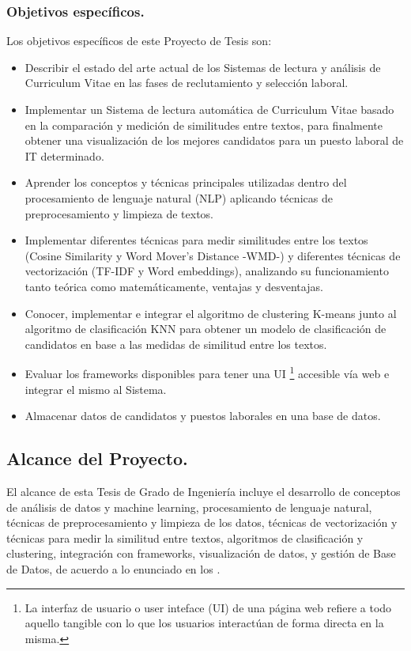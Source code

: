 \documentclass[12pt,a4paper]{article}
\begin{document}
\begin{sloppypar}
\subsubsection{Objetivos específicos.}\label{Obj_especif}
Los objetivos específicos de este Proyecto de Tesis son:
\begin{itemize}
\item Describir el estado del arte actual de los Sistemas de lectura y análisis de Curriculum Vitae en las fases de reclutamiento y selección laboral. 
\item Implementar un Sistema de lectura automática de Curriculum Vitae basado en la comparación y medición de similitudes entre textos, para finalmente obtener una visualización de los mejores candidatos para un puesto laboral de IT determinado.  
\item Aprender los conceptos y técnicas principales utilizadas dentro del procesamiento de lenguaje natural (NLP) aplicando técnicas de preprocesamiento y limpieza de textos.
\item Implementar diferentes técnicas para medir similitudes entre los textos (Cosine Similarity y Word Mover's Distance -WMD-) y diferentes técnicas de vectorización (TF-IDF y Word embeddings), analizando su funcionamiento tanto teórica como matemáticamente, ventajas y desventajas.
\item Conocer, implementar e integrar el algoritmo de clustering K-means junto al algoritmo de clasificación KNN para obtener un modelo de clasificación de candidatos en base a las medidas de similitud entre los textos.
\item Evaluar los frameworks disponibles para tener una UI \footnote{La interfaz de usuario o user inteface (UI) de una página web refiere a todo aquello tangible con lo que los usuarios interactúan de forma directa en la misma.} accesible vía web e integrar el mismo al Sistema.
\item Almacenar datos de candidatos y puestos laborales en una base de datos.
\end{itemize} 

\cleardoublepage    %

\subsection{Alcance del Proyecto.}
El alcance de esta Tesis de Grado de Ingeniería incluye el desarrollo de conceptos de análisis de datos y machine learning, procesamiento de lenguaje natural, técnicas de preprocesamiento y limpieza de los datos, técnicas de vectorización y técnicas para medir la similitud entre textos, algoritmos de clasificación y clustering, integración con frameworks, visualización de datos, y gestión de Base de Datos, de acuerdo a lo enunciado en los \textit{}.


\end{sloppypar}
\end{document}
